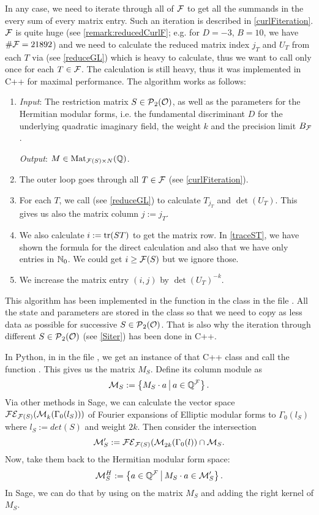 In any case, we need to iterate through all of $\mathcal{F}$ to get all the summands in the every sum of every matrix entry. Such an iteration is described in \cref{curlFiteration}. $\mathcal{F}$ is quite huge (see \cref{remark:reducedCurlF}; e.g. for $D=-3$, $B=10$, we have $\# \mathcal{F} = 21892$) and we need to calculate the reduced matrix index $j_T$ and $U_T$ from each $T$ via  (see \cref{reduceGL}) which is heavy to calculate, thus we want to call  only once for each $T \in \mathcal{F}$. The calculation is still heavy, thus it was implemented in C++ for maximal performance. The algorithm works as follows:
\begin{enumerate}
\item \emph{Input}: The restriction matrix $S \in \operatorname{\mathcal{P}}_2(\mathcal{O})$, as well as the parameters for the Hermitian modular forms, i.e. the fundamental discriminant $D$ for the underlying quadratic imaginary field, the weight $k$ and the precision limit $B_{\mathcal{F}}$.

\emph{Output}: $M \in \operatorname{Mat}_{\mathcal{F}(S) \times N}(\mathbb{Q})$.
\item The outer loop goes through all $T \in \mathcal{F}$ (see \cref{curlFiteration}).
\item For each $T$, we call  (see \cref{reduceGL}) to calculate $T_{j_T}$ and $\det(U_T)$. This gives us also the matrix column $j := j_T$.
\item We also calculate $i := \textup{\textrm{tr}}(ST)$ to get the matrix row. In \cref{traceST}, we have shown the formula for the direct calculation and also that we have only entries in $\mathbb{N}_0$. We could get $i \ge \mathcal{F}(S)$ but we ignore those.
\item We increase the matrix entry $(i,j)$ by $\det(U_T)^{-k}$.
\end{enumerate}
This algorithm has been implemented in the function  in the class  in the file . All the state and parameters are stored in the class so that we need to copy as less data as possible for successive $S \in \operatorname{\mathcal{P}}_2(\mathcal{O})$. That is also why the iteration through different $S \in \operatorname{\mathcal{P}}_2(\mathcal{O})$ (see \cref{Siter}) has been done in C++.

In Python, in  in the file , we get an instance of that C++ class and call the function . This gives us the matrix $M_S$. Define its column module as
\[ \mathcal{M}_S := \Set{M_S \cdot a}{a \in \Q^\F} . \]
Via other methods in Sage, we can calculate the vector space $ \mathcal{FE}_{\mathcal{F}(S)}(\operatorname{\mathcal{M}}^{}_{k} (\Gamma_0(l_S)))$ of Fourier expansions of Elliptic modular forms to $\Gamma_0(l_S)$ where $l_S := det(S)$ and weight $2k$. Then consider the intersection
\[ \mathcal{M}'_S := \mathcal{FE}_{\mathcal{F}(S)}(\operatorname{\mathcal{M}}^{}_{2k} (\Gamma_0(l)) \cap \mathcal{M}_S . \]
Now, take them back to the Hermitian modular form space:
\[ \mathcal{M}^H_S := \Set{a \in \Q^\F}{M_S \cdot a \in \mathcal{M}'_S} . \]
In Sage, we can do that by using  on the matrix $M_S$ and adding the right kernel of $M_S$.

